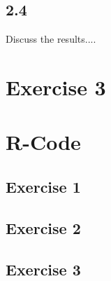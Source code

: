 \documentclass{article}
\begin{document}
    \subsection{2.4}
      Discuss the results....
      

  \section{Exercise 3}

  \section{R-Code}
    \subsection{Exercise 1}\label{sub:R1}

    \subsection{Exercise 2}\label{sub:R2}

    \subsection{Exercise 3}\label{sub:R3}
\end{document}
